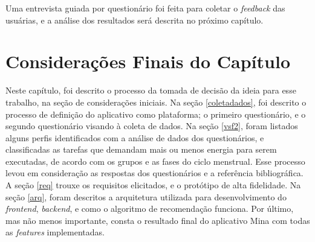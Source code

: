 Uma entrevista guiada por questionário foi feita para coletar o \emph{feedback} das usuárias, e a análise 
dos resultados será descrita no próximo capítulo. 


\section{Considerações Finais do Capítulo}

Neste capítulo, foi descrito o processo da tomada de decisão 
da ideia para 
esse trabalho, na seção de considerações iniciais. Na seção 
\ref{coletadados}, 
foi descrito o processo de definição do aplicativo como 
plataforma; o primeiro questionário, e o segundo questionário 
visando à coleta de dados. Na seção \ref{vsf2}, foram 
listados alguns perfis identificados 
com a análise de dados dos questionários, e classificadas as 
tarefas que demandam mais ou menos energia 
para serem executadas, de acordo com os grupos e as fases do ciclo menstrual. 
Esse processo levou em consideração 
as respostas dos questionários e a referência bibliográfica. 
A seção \ref{req} trouxe os requisitos elicitados, e o protótipo de alta fidelidade. 
Na seção \ref{arq}, foram descritos a arquitetura utilizada para desenvolvimento do 
\emph{frontend}, \emph{backend}, e como o algoritmo de recomendação funciona. Por último, 
mas não menos importante, consta o resultado final do aplicativo Mina com todas as \emph{features} 
implementadas.
